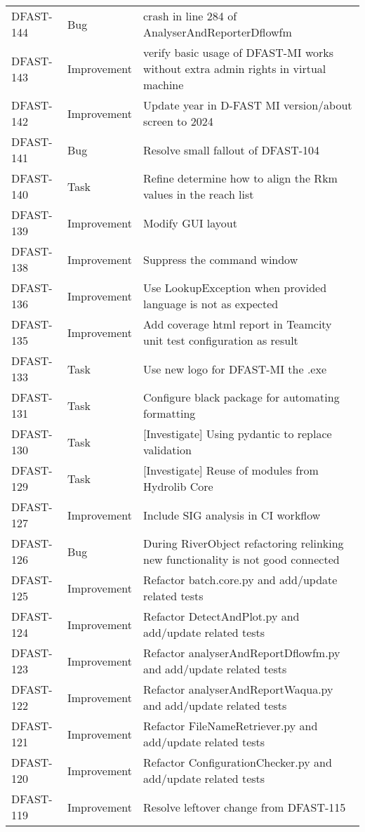 \documentclass[git]{deltares_manual}
\begin{document}
\begin{longtable}{l|l|p{8cm}}
DFAST-144 & Bug & crash in line 284 of AnalyserAndReporterDflowfm \\
DFAST-143 & Improvement & verify basic usage of DFAST-MI works without extra admin rights in virtual machine \\
DFAST-142 & Improvement & Update year in D-FAST MI version/about screen to 2024 \\
DFAST-141 & Bug & Resolve small fallout of DFAST-104 \\
DFAST-140 & Task & Refine determine how to align the Rkm values in the reach list \\
DFAST-139 & Improvement & Modify GUI layout \\
DFAST-138 & Improvement & Suppress the command window \\
DFAST-136 & Improvement & Use LookupException when provided language is not as expected \\
DFAST-135 & Improvement & Add coverage html report in Teamcity unit test configuration as result \\
DFAST-133 & Task & Use new logo for DFAST-MI the .exe \\
DFAST-131 & Task & Configure black package for automating formatting \\
DFAST-130 & Task & [Investigate] Using pydantic to replace validation \\
DFAST-129 & Task & [Investigate] Reuse of modules from Hydrolib Core \\
DFAST-127 & Improvement & Include SIG analysis in CI workflow \\
DFAST-126 & Bug & During RiverObject refactoring relinking new functionality is not good connected \\
DFAST-125 & Improvement & Refactor batch.core.py and add/update related tests \\
DFAST-124 & Improvement & Refactor DetectAndPlot.py and add/update related tests \\
DFAST-123 & Improvement & Refactor analyserAndReportDflowfm.py and add/update related tests \\
DFAST-122 & Improvement & Refactor analyserAndReportWaqua.py and add/update related tests \\
DFAST-121 & Improvement & Refactor FileNameRetriever.py and add/update related tests \\
DFAST-120 & Improvement & Refactor ConfigurationChecker.py and add/update related tests \\
DFAST-119 & Improvement & Resolve leftover change from DFAST-115 \\

\end{longtable}
\end{document}
